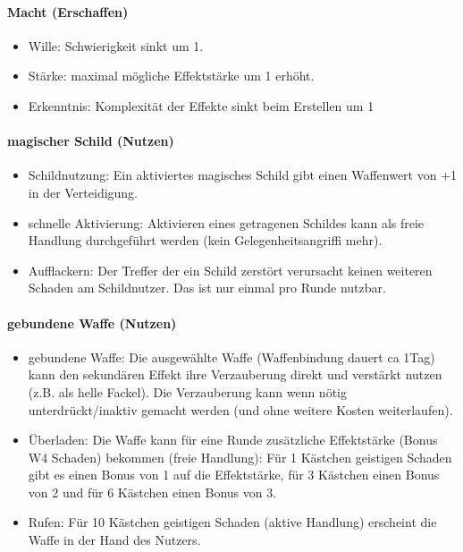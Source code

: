 \documentclass{article}
\begin{document}
\paragraph{Macht (Erschaffen)}

\begin{itemize}
\item Wille: Schwierigkeit sinkt um 1.
\item Stärke: maximal mögliche Effektstärke um 1 erhöht.
\item Erkenntnis: Komplexität der Effekte sinkt beim Erstellen um 1
\end{itemize}

\paragraph{magischer Schild (Nutzen)}

\begin{itemize}
\item Schildnutzung: Ein aktiviertes magisches Schild gibt einen Waffenwert von +1 in der Verteidigung.
\item schnelle Aktivierung: Aktivieren eines getragenen Schildes kann als freie Handlung durchgeführt werden (kein Gelegenheitsangriffi mehr).
\item Aufflackern: Der Treffer der ein Schild zerstört verursacht keinen weiteren Schaden am Schildnutzer. Das ist nur einmal pro Runde nutzbar.
\end{itemize}

\paragraph{gebundene Waffe (Nutzen)}

\begin{itemize}
\item gebundene Waffe: Die ausgewählte Waffe (Waffenbindung dauert ca 1Tag) kann den sekundären Effekt ihre Verzauberung direkt und verstärkt nutzen (z.B. als helle Fackel). Die Verzauberung kann wenn nötig unterdrückt/inaktiv gemacht werden (und ohne weitere Kosten weiterlaufen).
\item Überladen: Die Waffe kann für eine Runde zusätzliche Effektstärke (Bonus W4 Schaden) bekommen (freie Handlung): Für 1 Kästchen geistigen Schaden gibt es einen Bonus von 1 auf die Effektstärke, für 3 Kästchen einen Bonus von 2 und für 6 Kästchen einen Bonus von 3.
\item Rufen: Für 10 Kästchen geistigen Schaden (aktive Handlung) erscheint die Waffe in der Hand des Nutzers.
\end{itemize}
\end{document}
